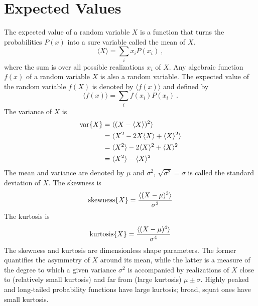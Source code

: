 \documentclass[12pt,a4paper]{article}
\begin{document}
\section{Expected Values}
The expected value of a random variable $X$ is a function that turns the probabilities $P(x)$ into a sure variable called the mean of $X$.
\begin{equation}
\langle X \rangle = \sum_i x_i P(x_i) ~,
\end{equation}
where the sum is over all possible realizations $x_i$ of $X$. Any algebraic function $f(x)$ of a random variable $X$ is also a random variable. The expected value of the random variable $f(X)$ is denoted by $\langle f(x) \rangle$  and defined by
\begin{equation}
\langle f(x) \rangle =  \sum_i f(x_i) P(x_i) ~.
\end{equation}
The variance of $X$ is
\begin{align*}
{\rm var} \{X\} &= \langle (X -\langle X \rangle)^2 \rangle \\
&= \langle X^2 -2X\langle X \rangle +\langle X \rangle^2 \rangle \\
&=  \langle X^2 \rangle -2\langle X \rangle^2 +\langle X \rangle^2 \\
&= \langle X^2 \rangle -\langle X \rangle^2
\end{align*}
The mean and variance are denoted by $\mu$ and $\sigma^2$, $\sqrt{\sigma^2} = \sigma$ is called the standard deviation of $X$. The skewness is
\begin{equation}
{\rm skewness} \{X\} = \frac{\langle (X -\mu)^3 \rangle}{\sigma^3}
\end{equation}
The kurtosis is
\begin{equation}
{\rm kurtosis} \{X\} = \frac{\langle (X -\mu)^4 \rangle}{\sigma^4}
\end{equation}
The skewness and kurtosis are dimensionless shape parameters. The former quantifies the asymmetry of $X$ around its mean, while the latter is a measure of the degree to which a given variance $\sigma^2$ is accompanied by realizations of $X$ close to (relatively small kurtosis) and far from (large kurtosis) $\mu \pm \sigma$. Highly peaked and long-tailed probability functions have large kurtosis; broad, squat ones have small kurtosis. 
\end{document}
